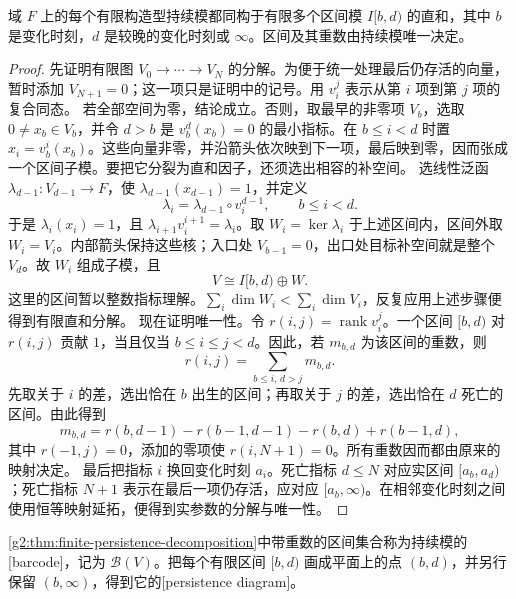 \begin{theorem}[区间分解]\label{g2:thm:finite-persistence-decomposition}
	域 \(F\) 上的每个有限构造型持续模都同构于有限多个区间模 \(I[b,d)\) 的直和，其中 \(b\) 是变化时刻，\(d\) 是较晚的变化时刻或 \(\infty\)。区间及其重数由持续模唯一决定。
\end{theorem}

\begin{proof}
	先证明有限图 \(V_0\to\cdots\to V_N\) 的分解。为便于统一处理最后仍存活的向量，暂时添加 \(V_{N+1}=0\)；这一项只是证明中的记号。用 \(v_i^j\) 表示从第 \(i\) 项到第 \(j\) 项的复合同态。
	\ProseParagraphBreak
	若全部空间为零，结论成立。否则，取最早的非零项 \(V_b\)，选取 \(0\neq x_b\in V_b\)，并令 \(d>b\) 是 \(v_b^d(x_b)=0\) 的最小指标。在 \(b\leq i<d\) 时置 \(x_i=v_b^i(x_b)\)。这些向量非零，并沿箭头依次映到下一项，最后映到零，因而张成一个区间子模。要把它分裂为直和因子，还须选出相容的补空间。
	\ProseParagraphBreak
	选线性泛函 \(\lambda_{d-1}:V_{d-1}\to F\)，使 \(\lambda_{d-1}(x_{d-1})=1\)，并定义
	\[
		\lambda_i=\lambda_{d-1}\circ v_i^{d-1},\qquad b\leq i<d.
	\]
	于是 \(\lambda_i(x_i)=1\)，且 \(\lambda_{i+1}v_i^{i+1}=\lambda_i\)。取 \(W_i=\ker\lambda_i\) 于上述区间内，区间外取 \(W_i=V_i\)。内部箭头保持这些核；入口处 \(V_{b-1}=0\)，出口处目标补空间就是整个 \(V_d\)。故 \(W_i\) 组成子模，且
	\[
		V\cong I[b,d)\oplus W.
	\]
	这里的区间暂以整数指标理解。\(\sum_i\dim W_i<\sum_i\dim V_i\)，反复应用上述步骤便得到有限直和分解。
	\ProseParagraphBreak
	现在证明唯一性。令 \(r(i,j)=\operatorname{rank}v_i^j\)。一个区间 \([b,d)\) 对 \(r(i,j)\) 贡献 \(1\)，当且仅当 \(b\leq i\leq j<d\)。因此，若 \(m_{b,d}\) 为该区间的重数，则
	\[
		r(i,j)=\sum_{b\leq i,\,d>j}m_{b,d}.
	\]
	先取关于 \(i\) 的差，选出恰在 \(b\) 出生的区间；再取关于 \(j\) 的差，选出恰在 \(d\) 死亡的区间。由此得到
	\begin{equation}\label{g2:eq:persistence-multiplicity}
		m_{b,d}=r(b,d-1)-r(b-1,d-1)-r(b,d)+r(b-1,d),
	\end{equation}
	其中 \(r(-1,j)=0\)，添加的零项使 \(r(i,N+1)=0\)。所有重数因而都由原来的映射决定。
	\ProseParagraphBreak
	最后把指标 \(i\) 换回变化时刻 \(a_i\)。死亡指标 \(d\leq N\) 对应实区间 \([a_b,a_d)\)；死亡指标 \(N+1\) 表示在最后一项仍存活，应对应 \([a_b,\infty)\)。在相邻变化时刻之间使用恒等映射延拓，便得到实参数的分解与唯一性。
\end{proof}

\begin{definition}\label{g2:def:persistence-barcode}
	\cref{g2:thm:finite-persistence-decomposition}中带重数的区间集合称为持续模的[barcode]，记为 \(\mathcal B(V)\)。把每个有限区间 \([b,d)\) 画成平面上的点 \((b,d)\)，并另行保留 \((b,\infty)\)，得到它的[persistence diagram]。
\end{definition}

